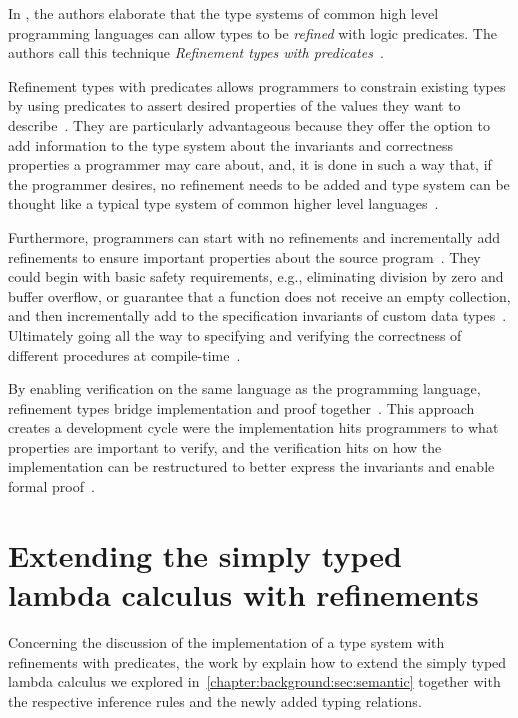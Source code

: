 \documentclass[
  oneside,
  english,
  coorientadorbanca,
  noabntexcite
]{ufsc-thesis-rn46-2019}
\begin{document}
In \textcite{jhala2020tutorial}, the authors elaborate that the type systems of common high level programming languages can allow types to be \textit{refined} with logic predicates.
The authors call this technique \textit{Refinement types with predicates}~\cite{jhala2020tutorial}.

Refinement types with predicates allows programmers to constrain existing types by using predicates to assert desired properties of the values they want to describe~\cite{jhala2020tutorial}.
They are particularly advantageous because they offer the option to add information to the type system about the invariants and correctness properties a programmer may care about, and, it is done in such a way that, if the programmer desires, no refinement needs to be added and type system can be thought like a typical type system of common higher level languages~\cite{jhala2020tutorial}.

Furthermore, programmers can start with no refinements and incrementally add refinements to ensure important properties about the source program~\cite{jhala2020tutorial}.
They could begin with basic safety requirements, e.g., eliminating division by zero and buffer overflow, or guarantee that a function does not receive an empty collection, and then incrementally add to the specification invariants of custom data types~\cite{jhala2020tutorial}.
Ultimately going all the way to specifying and verifying the correctness of different procedures at compile-time~\cite{jhala2020tutorial}.

By enabling verification on the same language as the programming language, refinement types bridge implementation and proof together~\cite{jhala2020tutorial}.
This approach creates a development cycle were the implementation hits programmers to what properties are important to verify, and the verification hits on how the implementation can be restructured to better express the invariants and enable formal proof~\cite{jhala2020tutorial}.


\section{Extending the simply typed lambda calculus with refinements}

Concerning the discussion of the implementation of a type system with refinements with predicates, the work by \textcite{jhala2020tutorial} explain how to extend the simply typed lambda calculus we explored in~\cref{chapter:background:sec:semantic} together with the respective inference rules and the newly added typing relations.
\end{document}
